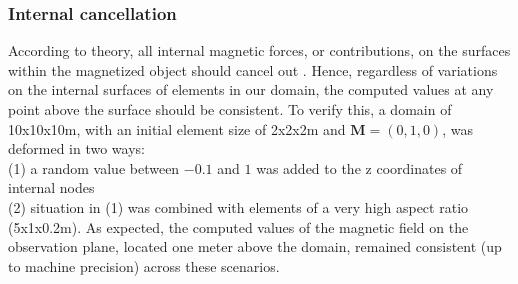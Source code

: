 \subsubsection{Internal cancellation}
According to theory, all internal magnetic forces, or contributions, on the surfaces within the magnetized object should cancel out \parencite{JACKSON}. Hence, regardless of variations on the internal surfaces of elements in our domain, the computed values at any point above the surface should be consistent. To verify this, a domain of 10x10x10m, with an initial element size of 2x2x2m and $\mathbf{M}= (0,1,0)$, was deformed in two ways: \\ (1) a random value between $-0.1$ and $1$ was added to the z coordinates of internal nodes \\ (2) situation in (1) was combined with elements of a very high aspect ratio (5x1x0.2m). As expected, the computed values of the magnetic field on the observation plane, located one meter above the domain, remained consistent (up to machine precision) across these scenarios. 

